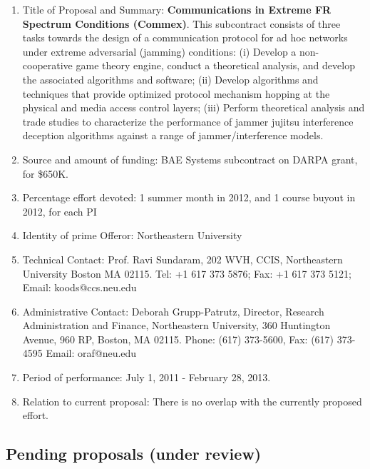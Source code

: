 \begin{enumerate}
\item Title of Proposal and Summary: {\bf Communications in Extreme FR
  Spectrum Conditions (Commex)}.  This subcontract consists of three
  tasks towards the design of a communication protocol for ad hoc
  networks under extreme adversarial (jamming) conditions: (i) Develop
  a non-cooperative game theory engine, conduct a theoretical
  analysis, and develop the associated algorithms and software; (ii)
  Develop algorithms and techniques that provide optimized protocol
  mechanism hopping at the physical and media access control layers;
  (iii) Perform theoretical analysis and trade studies to characterize
  the performance of jammer jujitsu interference deception algorithms
  against a range of jammer/interference models.  
\item Source and amount of funding: BAE Systems subcontract on DARPA
  grant, for \$650K.
\item Percentage effort devoted: 1 summer month in 2012, and 1 course buyout in 2012, for each PI
\item Identity of prime Offeror: Northeastern University
\item Technical Contact: Prof. Ravi Sundaram,  202 WVH, CCIS, Northeastern University
Boston MA 02115.  Tel: +1 617 373 5876;  Fax: +1 617 373 5121;  Email: koods@ccs.neu.edu 
\item Administrative Contact: Deborah Grupp-Patrutz, Director,
  Research Administration and Finance, Northeastern University, 360
  Huntington Avenue, 960 RP, Boston, MA 02115. Phone: (617) 373-5600,
  Fax: (617) 373-4595 Email: oraf@neu.edu
\item  Period of performance: July 1, 2011 - February 28, 2013.
\item Relation to current proposal: There is no overlap with the currently proposed effort.
\end{enumerate}

\subsection{Pending proposals (under review)}

